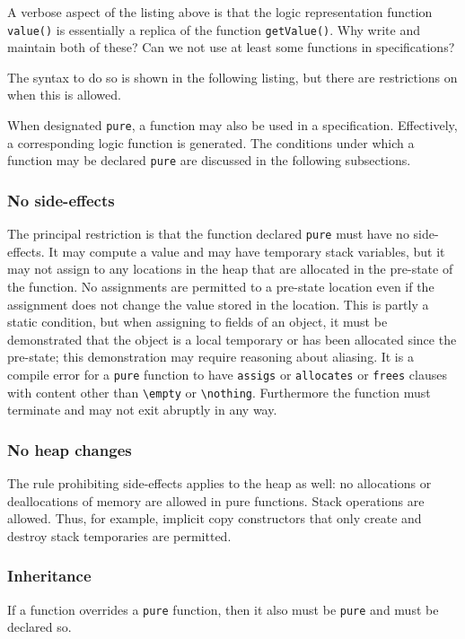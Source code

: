 \experimental

A verbose aspect of the listing above is that the logic representation function \lstinline|value()| is essentially a replica of
the \lang function \lstinline|getValue()|. Why write and maintain both of these? Can we not use at least some \lang functions in 
specifications?

The syntax to do so is shown in the following listing, but there are
restrictions on when this is allowed.



When designated \lstinline|pure|, a \lang function may also be used in a \NAME specification. Effectively, a corresponding logic function is generated. 
The conditions under which a 
\lang function may be declared \lstinline|pure| are discussed in the following subsections.

\subsubsection{No side-effects}
The principal restriction is that the function declared \lstinline|pure| must have no side-effects. It may compute a value and may have 
temporary stack variables, but it may not assign to any locations in the heap that are allocated in the pre-state of the function.
No assignments are permitted to a pre-state location even if the assignment does not change the value stored in the location.
This is partly a static condition, but when assigning to fields of an object, it must be demonstrated that the object is a local temporary or
has been allocated since the pre-state; this demonstration may require reasoning about aliasing. It is a compile error for a \lstinline|pure|
function to have \lstinline|assigs| or \lstinline|allocates| or \lstinline|frees| clauses with content other than \lstinline|\empty| or \lstinline|\nothing|.
Furthermore the function must terminate and may not exit abruptly in any way.

\subsubsection{No heap changes}
The rule prohibiting side-effects applies to the heap as well:
no allocations or deallocations of memory are allowed in pure functions.
Stack operations are allowed. Thus, for example,
 implicit copy constructors that 
only create and destroy stack temporaries are permitted.

\subsubsection{Inheritance}
If a function overrides a \lstinline|pure| function, then it also must be \lstinline|pure| and must be declared so.

